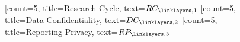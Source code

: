 \documentclass[fleqn,14pt,a4paper,final]{article}
\begin{document}
\begin{figure}[h!]
\begin{neuralnetwork}[height=2.5 ,maintitleheight=2cm,layertitleheight=3cm]
  \newcommand{\nodetextz}[2]{$RP_{#2,3}$}
  \newcommand{\nodetexth}[2]{$RC_{#2,1}$}
  \newcommand{\nodetexthto}[2]{$DC_{#2,2}$}
  \hiddenlayer[count=5, title={Research Cycle}, text=\nodetexth]
  \linklayers
  \hiddenlayer[count=5, title={Data Confidentiality}, text=\nodetexthto]
   \linklayers
  \outputlayer[count=5, title={Reporting Privacy}, text=\nodetextz] 
  \linklayers
\end{neuralnetwork}
\end{figure}
\end{document}
